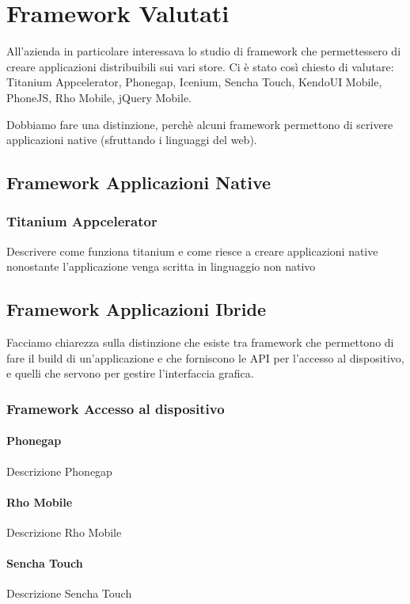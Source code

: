 \chapter{Framework Valutati}
	All'azienda in particolare interessava lo studio di framework che
	permettessero di creare applicazioni distribuibili sui vari store.
	Ci è stato così chiesto di valutare: Titanium Appcelerator, Phonegap,
	Icenium, Sencha Touch, KendoUI Mobile, PhoneJS, Rho Mobile, jQuery Mobile.
	
	Dobbiamo fare una distinzione, perchè alcuni framework permettono di
	scrivere applicazioni native (sfruttando i linguaggi del web).
	
	\section{Framework Applicazioni Native}
	
		\subsection{Titanium Appcelerator}
		\label{sec:titanium}
			Descrivere come funziona titanium e come riesce a creare
			applicazioni native nonostante l'applicazione venga scritta in
			linguaggio non nativo
			
	\section{Framework Applicazioni Ibride}
		Facciamo chiarezza sulla distinzione che esiste tra framework che
		permettono di fare il build di un'applicazione e che forniscono le API
		per l'accesso al dispositivo, e quelli che servono per gestire
		l'interfaccia grafica.
	
		\subsection{Framework Accesso al dispositivo}
	
			\subsubsection{Phonegap}
				Descrizione Phonegap
	
			\subsubsection{Rho Mobile}
				Descrizione Rho Mobile
	
			\subsubsection{Sencha Touch}
				Descrizione Sencha Touch
	
